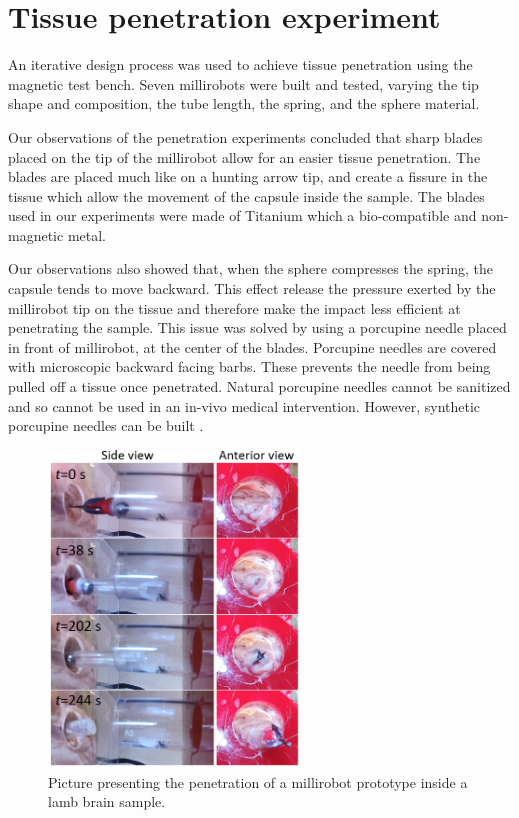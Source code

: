 \documentclass[letterpaper, 10 pt, conference]{ieeeconf}  %
\begin{document}
\section{Tissue penetration experiment}

An iterative design process was used to achieve tissue penetration using the magnetic test bench. Seven millirobots were built and tested, varying the tip shape and composition, the tube length, the spring, and the sphere material. \par
Our observations of the penetration experiments concluded that sharp blades placed on the tip of the millirobot allow for an easier tissue penetration. The blades are placed much like on a hunting arrow tip, and create a fissure in the tissue which allow the movement of the capsule inside the sample. The blades used in our experiments were made of Titanium which a bio-compatible and non-magnetic metal.\par
Our observations also showed that, when the sphere compresses the spring, the capsule tends to move backward. This effect release the pressure exerted by the millirobot tip on the tissue and therefore make the impact less efficient at penetrating the sample. This issue was solved by using a porcupine needle placed in front of millirobot, at the center of the blades. Porcupine needles are covered with microscopic backward facing barbs. These prevents the needle from being pulled off a tissue once penetrated. Natural porcupine needles cannot be sanitized and so cannot be used in an in-vivo medical intervention. However, synthetic porcupine needles can be built \cite{cho2012microstructured}.\par

\begin{figure}
	\centering
  \includegraphics[width=190pt]{brain_penetration.png}
  \caption{Picture presenting the penetration of a millirobot prototype inside a lamb brain sample.}
  \label{brain_penetration}
\end{figure}
\end{document}
